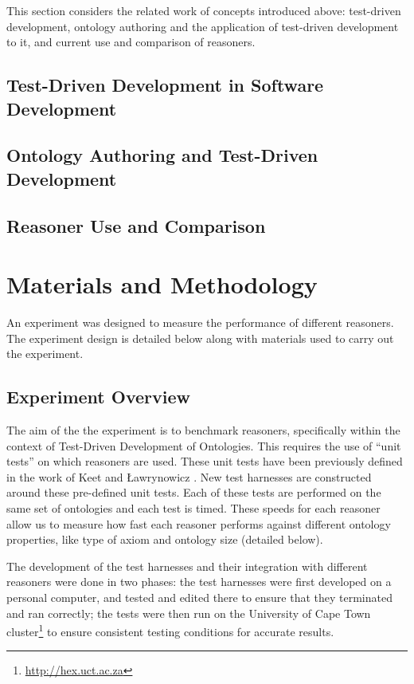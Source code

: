 \documentclass[draft]{sig-alternate-05-2015}
\newcommand{\todo}[1][]{\ifdraft{\ifthenelse{\isempty{#1}}{\hl{(TODO)}}{\hl{(TODO: #1)}}}{}}
\begin{document}
This section considers the related work of concepts introduced above: test-driven development, ontology authoring and the application of test-driven development to it, and current use and comparison of reasoners.

\subsection{Test-Driven Development in Software Development}

\todo

\subsection{Ontology Authoring and Test-Driven Development}

\todo

\subsection{Reasoner Use and Comparison}

\todo

\section{Materials and Methodology}

An experiment was designed to measure the performance of different reasoners. The experiment design is detailed below along with materials used to carry out the experiment.

\subsection{Experiment Overview}
The aim of the the experiment is to benchmark reasoners, specifically within the context of Test-Driven Development of Ontologies. This requires the use of ``unit tests'' on which reasoners are used. These unit tests have been previously defined in the work of Keet and \L{}awrynowicz \cite{DBLP:conf/esws/KeetL16}. New test harnesses are constructed around these pre-defined unit tests. Each of these tests are performed on the same set of ontologies and each test is timed. These speeds for each reasoner allow us to measure how fast each reasoner performs against different ontology properties, like type of axiom and ontology size (detailed below).

The development of the test harnesses and their integration with different reasoners were done in two phases: the test harnesses were first developed on a personal computer, and tested and edited there to ensure that they terminated and ran correctly; the tests were then run on the University of Cape Town cluster\footnote{\url{http://hex.uct.ac.za}} to ensure consistent testing conditions for accurate results.
\end{document}

